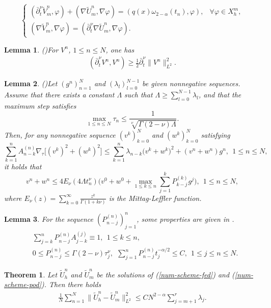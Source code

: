 \documentclass[10pt,a4paper]{amsart}
\newtheorem{lemma}{Lemma}
\newtheorem{theorem}{Theorem}
\begin{document}
\begin{equation}\label{num-scheme-pod}
\begin{cases}
  (\bar\partial_t^\nu \widetilde{V}_m^n,\varphi) + (\nabla \widetilde{U}_m^n,\nabla \varphi) = (q(x)\omega_{2-\alpha}(t_n),\varphi), & \forall \varphi\in X_h^m, \\
  (\nabla\widetilde{V}_m^n,\nabla\varphi)  = (\bar\partial_t^\nu \nabla\widetilde{U}_m^n,\nabla\varphi).
\end{cases}
\end{equation}

\begin{lemma}\label{FD-ineq}
(\cite{LiaoH2018L1})For $V^n$, $1\leq n\leq N$, one has
\begin{align*}
(\bar\partial_t^\nu V^n,V^n)\geq \frac{1}{2}\bar\partial_t^\nu \|V^n\|_{L^2}^2.    
\end{align*}
\end{lemma}

\begin{lemma}\label{grownwall}
(\cite{LyuP2022SFOR})Let $(g^n)_{n=1}^N$ and $(\lambda_l)_{l=0}^{N-1}$ be given nonnegative sequences. Assume that there exists a constant $\Lambda$ such that $\Lambda\geq\sum_{l=0}^{N-1}\lambda_l$, and that the maximum step satisfies 
$$\max_{1\leq n \leq N}\tau_n\leq \frac{1}{\sqrt[\nu]{\Gamma{(2-\nu)}\Lambda}}.$$
Then, for any nonnegative sequence $(v^k)_{k=0}^N$ and $(w^k)_{k=0}^N$ satisfying
$$\sum_{k=1}^nA_{n-k}^{(n)}\nabla_\tau\big[(v^k)^2+(w^k)^2\big]\leq\sum_{k=1}^n\lambda_{n-k}\big(v^k+w^k\big)^2+(v^n+w^n)g^n,~~1\leq n\leq N,$$
it holds that
$$v^n+w^n\leq 4E_\nu(4\Lambda t_n^\nu)\bigg(v^0+w^0+\max_{1\leq k\leq n}\sum_{j=1}^kP_{k-j}^{(k)}g^j\bigg),~~1\leq n\leq N,$$
where $E_\nu(z)=\sum_{k=0}^\infty\frac{z^k}{\Gamma{(1+k\nu)}}$ is the Mittag-Leffler function.
\end{lemma}

\begin{lemma}\label{P}
For the sequence $(P_{n-j}^{(n)})_{j=1}^n$, some properties are given in \cite{LiaoH2018L1}.
\begin{align*}
&\sum_{j=k}^nP_{n-j}^{(n)}A_{j-k}^{(j)}\equiv1,~~1\leq k\leq n,\\
&0\leq P_{n-j}^{(n)}\leq \Gamma{(2-\nu)}\tau_j^\nu,~~\sum_{j=1}^nP_{n-j}^{(n)}t_j^{-\alpha/2}\leq C,~~ 1\leq j\leq n\leq N.  
\end{align*}
\end{lemma}

\begin{theorem}\label{error-adj}
Let $\widetilde{U}_h^n$ and $\widetilde{U}_m^n$ be the solutions of (\ref{num-scheme-fed}) and (\ref{num-scheme-pod}). Then there holds 
\begin{align*} 
\frac{1}{N}\sum_{n=1}^N\|\widetilde{U}_h^n-\widetilde{U}_m^n\|_{L^2}^2\leq CN^{2-\alpha}\sum_{j=m+1}^r\lambda_j.    
\end{align*} 
\end{theorem}
\end{document}
